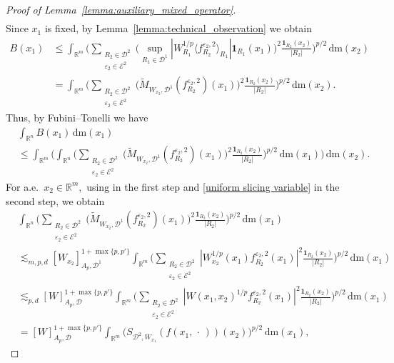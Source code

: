\documentclass{article}
\theoremstyle{definition}
\theoremstyle{remark}
\numberwithin{equation}{section}
\newcommand{\mathdm}{\,\mathrm{dm}}
\newcommand{\cD}{\mathcal{D}}
\newcommand{\cE}{\mathcal{E}}
\newcommand{\bfD}{\bm{\mathcal{D}}}
\newcommand{\e}{\varepsilon}
\newcommand{\reals}{\mathbb{R}}
\newcommand{\1}{\mathbf{1}}
\newcommand{\var}{\,\cdot\,}
\begin{document}
\begin{proof}[Proof of Lemma~\ref{lemma:auxiliary_mixed_operator}]
\begin{align*}
        \end{align*}
        Since $x_1$ is fixed, by Lemma~\ref{lemma:technical_observation} we obtain
        \begin{align*}
            B(x_1)&\leq 
            \int_{\reals^m}\bigg(\sum_{\substack{R_2\in\cD^2\\\e_2\in\cE^2}}\bigg(\sup_{R_1\in\cD^1}|W_{R_1}^{1/p}\langle f_{R_2}^{\e_2,2}\rangle_{R_1}|\1_{R_1}(x_1)\bigg)^2\frac{\1_{R_2}(x_2)}{|R_2|}\bigg)^{p/2}\mathdm(x_2)\\
            &=\int_{\reals^m}\bigg(\sum_{\substack{R_2\in\cD^2\\\e_2\in\cE^2}}\bigg(\widetilde{M}_{W_{x_2},\cD^1}(f_{R_2}^{\e_2,2})(x_1)\bigg)^2\frac{\1_{R_2}(x_2)}{|R_2|}\bigg)^{p/2}\mathdm(x_2).
        \end{align*}
        Thus, by Fubini--Tonelli we have
        \begin{align*}
            &\int_{\reals^n}B(x_1)\mathdm(x_1)\\
            &\leq\int_{\reals^m}\bigg(\int_{\reals^n}\bigg(\sum_{\substack{R_2\in\cD^2\\\e_2\in\cE^2}}\bigg(\widetilde{M}_{W_{x_2},\cD^1}(f_{R_2}^{\e_2,2})(x_1)\bigg)^2\frac{\1_{R_2}(x_2)}{|R_2|}\bigg)^{p/2}\mathdm(x_1)\bigg)\mathdm(x_2).
        \end{align*}
        For a.e.~$x_2\in\reals^m,$ using  in the first step and \eqref{uniform slicing variable} in the second step, we obtain
        \begin{align*}
            &\int_{\reals^n}\bigg(\sum_{\substack{R_2\in\cD^2\\\e_2\in\cE^2}}\bigg(\widetilde{M}_{W_{x_2},\cD^1}(f_{R_2}^{\e_2,2})(x_1)\bigg)^2\frac{\1_{R_2}(x_2)}{|R_2|}\bigg)^{p/2}\mathdm(x_1)\\
            &\lesssim_{m,p,d}[W_{x_2}]_{A_p,\cD^1}^{1+\max\{p,p'\}}\int_{\reals^m}\bigg(\sum_{\substack{R_2\in\cD^2\\\e_2\in\cE^2}}|W_{x_2}^{1/p}(x_1)f_{R_2}^{\e_2,2}(x_1)|^2\frac{\1_{R_2}(x_2)}{|R_2|}\bigg)^{p/2}\mathdm(x_1)\\
            &\lesssim_{p,d}[W]_{A_p,\bfD}^{1+\max\{p,p'\}}\int_{\reals^m}\bigg(\sum_{\substack{R_2\in\cD^2\\\e_2\in\cE^2}}|W(x_1,x_2)^{1/p}f_{R_2}^{\e_2,2}(x_1)|^2\frac{\1_{R_2}(x_2)}{|R_2|}\bigg)^{p/2}\mathdm(x_1)\\
            &=[W]_{A_p,\bfD}^{1+\max\{p,p'\}}\int_{\reals^m}\bigg(S_{\cD^2,W_{x_1}}(f(x_1,\var))(x_2)\bigg)^{p/2}\mathdm(x_1),

\end{align*}
\end{proof}
\end{document}
